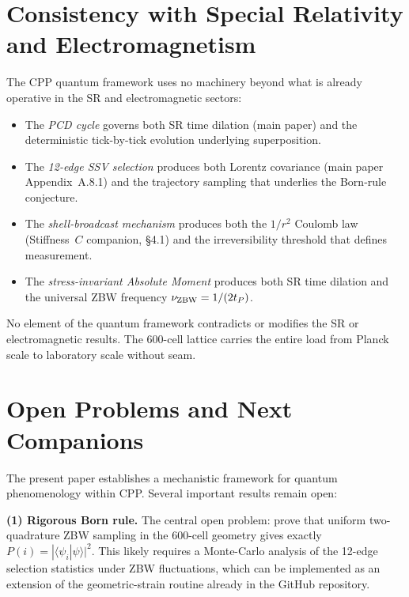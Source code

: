\documentclass[12pt]{article}
\newcommand{\tP}{t_P}
\begin{document}
\section{Consistency with Special Relativity and Electromagnetism}
\label{sec:consistency}

The CPP quantum framework uses no machinery beyond what is already operative
in the SR and electromagnetic sectors:

\begin{itemize}[noitemsep]
  \item The \emph{PCD cycle} governs both SR time dilation (main paper) and
    the deterministic tick-by-tick evolution underlying superposition.
  \item The \emph{12-edge SSV selection} produces both Lorentz covariance
    (main paper Appendix~A.8.1) and the trajectory sampling that underlies
    the Born-rule conjecture.
  \item The \emph{shell-broadcast mechanism} produces both the $1/r^2$
    Coulomb law (Stiffness~$C$ companion, \S 4.1) and the irreversibility
    threshold that defines measurement.
  \item The \emph{stress-invariant Absolute Moment} produces both SR time
    dilation and the universal ZBW frequency $\nu_{\rm ZBW} = 1/(2\tP)$.
\end{itemize}

No element of the quantum framework contradicts or modifies the SR or
electromagnetic results.  The 600-cell lattice carries the entire load from
Planck scale to laboratory scale without seam.

\section{Open Problems and Next Companions}
\label{sec:open}

The present paper establishes a mechanistic framework for quantum
phenomenology within CPP.  Several important results remain open:

\textbf{(1) Rigorous Born rule.}  The central open problem: prove that
uniform two-quadrature ZBW sampling in the 600-cell geometry gives exactly
$P(i) = |\langle\psi_i|\psi\rangle|^2$.  This likely requires a Monte-Carlo
analysis of the 12-edge selection statistics under ZBW fluctuations, which
can be implemented as an extension of the geometric-strain routine already
in the GitHub repository.
\end{document}
